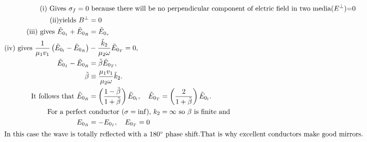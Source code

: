 \begin{align*}
\text{(i) Gives $\sigma_{f}=0$}&\text{ because there will be no perpendicular component of elctric field in two media($E^{\perp}$)=0}\\
\text{(ii)yields }B^{\perp}&=0\\
\text{(iii) gives }\tilde{E}_{0_{1}}+\tilde{E}_{0_{R}}&=\tilde{E}_{0_{\tau}}\\
\text{(iv) gives }\frac{1}{\mu_{1} v_{1}}\left(\tilde{E}_{0_{l}}-\tilde{E}_{0_{R}}\right)&-\frac{\tilde{k}_{2}}{\mu_{2} \omega} \tilde{E}_{0_{T}}=0, \\
\tilde{E}_{0_{I}}-\tilde{E}_{0_{R}}&=\tilde{\beta} \tilde{E}_{0_{T}}, \\
\tilde{\beta} &\equiv \frac{\mu_{1} v_{1}}{\mu_{2} \omega} \tilde{k}_{2} .\\
\text{It follows that }
\tilde{E}_{0_{R}}&=\left(\frac{1-\tilde{\beta}}{1+\tilde{\beta}}\right) \tilde{E}_{0_{l}}, \quad \tilde{E}_{0_{T}}=\left(\frac{2}{1+\tilde{\beta}}\right) \tilde{E}_{0_{l}} .\\
\text{For a perfect }&\text{conductor ($\sigma=\inf$), $k_2=\infty$ so $\beta$ is finite and }\\
E_{0_R}&=-E_{0_I}, \quad E_{0_T}=0\\
\intertext{In this case the wave is totally reflected with a $180^{\circ}$ phase shift.That is why excellent conductors make good mirrors.}
\end{align*}

